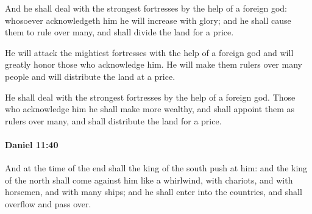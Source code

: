 			\begin{versebox}
					\item[BHS] 
					\item[LXX] 
					\item[ASV] And he shall deal with the strongest fortresses by the help of a foreign god: whosoever acknowledgeth him he will increase with glory; and he shall cause them to rule over many, and shall divide the land for a price.
					\item[NIV] He will attack the mightiest fortresses with the help of a foreign god and will greatly honor those who acknowledge him. He will make them rulers over many people and will distribute the land at a price.
					\item[NRSV] He shall deal with the strongest fortresses by the help of a foreign god. Those who acknowledge him he shall make more wealthy, and shall appoint them as rulers over many, and shall distribute the land for a price.
			\end{versebox}

		\paragraph{Daniel 11:40} %
			\label{DANIEL-11-40}

			And at the time of the end shall the king of the south push at him: and the king of the north shall come against him like a whirlwind, with chariots, and with horsemen, and with many ships; and he shall enter into the countries, and shall overflow and pass over.

